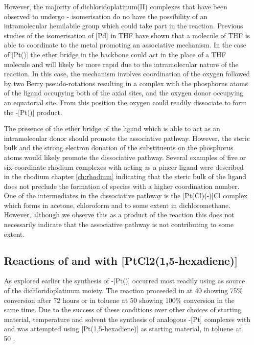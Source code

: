 However, the majority of dichloridoplatinum(II) complexes that have been observed to undergo \cis{}-\trans{} isomerisation do no have the possibility of an intramolecular hemilabile group which could take part in the reaction.  Previous studies of the isomerisation of [Pd] in THF have shown that a molecule of THF is able to coordinate to the metal promoting an associative mechanism.  In the case of [Pt(\tButhixantphos)] the ether bridge in the backbone could act in the place of a THF molecule and will likely be more rapid due to the intramolecular nature of the reaction.  In this case, the mechanism involves coordination of the oxygen followed by two Berry pseudo-rotations resulting in a complex with the phosphorus atoms of the \tButhixantphos{} ligand occupying both of the axial sites, and the oxygen donor occupying an equatorial site.  From this position the oxygen could readily dissociate to form the \trans-[Pt(\tButhixantphos)] product.

The presence of the ether bridge of the \tButhixantphos{} ligand which is able to act as an intramolecular donor should promote the associative pathway.  However, the steric bulk and the strong electron donation of the \tBu{} substituents on the phosphorus atoms would likely promote the dissociative pathway.  Several examples of five or six-coordinate rhodium complexes with \tButhixantphos{} acting as a pincer ligand were described in the rhodium chapter \ref{ch:rhodium} indicating that the steric bulk of the ligand does not preclude the formation of species with a higher coordination number.  One of the intermediates in the dissociative pathway is the [Pt(Cl)(\POP-\tButhixantphos)]Cl complex which forms in acetone, chloroform and to some extent in dichloromethane.  However, although we observe this as a product of the reaction this does not necessarily indicate that the associative pathway is not contributing to some extent.

\subsection{Reactions of \tBusixantphos{} and \tBuxantphos{} with [PtCl2(1,5-hexadiene){]}}

As explored earlier the synthesis of \trans-[Pt(\tButhixantphos)] occurred most readily using  as source of the dichloridoplatinum moiety.  The reaction proceeded in  at 40 \degC{} showing 75\% conversion after 72 hours or in toluene at 50\degC{} showing 100\% conversion in the same time.  Due to the success of these conditions over other choices of starting material, temperature and solvent the synthesis of analogous \trans-[Pt] complexes with \tBusixantphos{} and \tBuxantphos{} was attempted using [Pt(1,5-hexadiene)] as starting material, in toluene at 50 \degC{}.  

